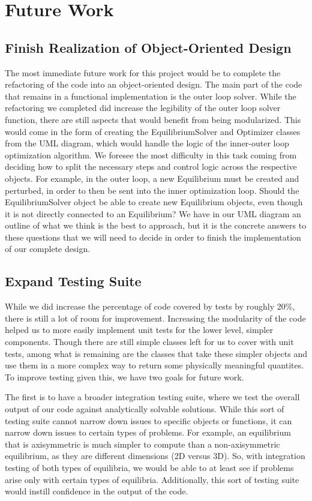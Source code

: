 \documentclass{article}
\begin{document}
\section{Future Work}

\subsection{Finish Realization of Object-Oriented Design}

The most immediate future work for this project would be to complete the refactoring of the code into an object-oriented design.
The main part of the code that remains in a functional implementation is the outer loop solver.
While the refactoring we completed did increase the legibility of the outer loop solver function, there are still aspects that would benefit from being modularized.
This would come in the form of creating the EquilibriumSolver and Optimizer classes from the UML diagram, which would handle the logic of the inner-outer loop optimization algorithm.
We foresee the most difficulty in this task coming from deciding how to split the necessary steps and control logic across the respective objects.
For example, in the outer loop, a new Equilibrium must be created and perturbed, in order to then be sent into the inner optimization loop.
Should the EquilibriumSolver object be able to create new Equilibrium objects, even though it is not directly connected to an Equilibrium?
We have in our UML diagram an outline of what we think is the best to approach, but it is the concrete answers to these questions that we will need to decide in order to finish the implementation of our complete design.

\subsection{Expand Testing Suite}
While we did increase the percentage of code covered by tests by roughly 20\%, there is still a lot of room for improvement.
Increasing the modularity of the code helped us to more easily implement unit tests for the lower level, simpler components.
Though there are still simple classes left for us to cover with unit tests, among what is remaining are the classes that take these simpler objects and use them in a more complex way to return some physically meaningful quantites.
To improve testing given this, we have two goals for future work.

The first is to have a broader integration testing suite, where we test the overall output of our code against analytically solvable solutions.
While this sort of testing suite cannot narrow down issues to specific objects or functions, it can narrow down issues to certain types of problems.
For example, an equilibrium that is axisymmetric is much simpler to compute than a non-axisymmetric equilibrium, as they are different dimensions (2D versus 3D).
So, with integration testing of both types of equilibria, we would be able to at least see if problems arise only with certain types of equilibria.
Additionally, this sort of testing suite would instill confidence in the output of the code.
\end{document}
